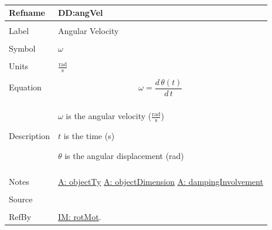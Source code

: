 \documentclass[12pt]{article}
\begin{document}
~\newline
 \noindent \begin{minipage}{\textwidth}
\begin{tabular}{p{} p{}}
\toprule \textbf{Refname} & \textbf{DD:angVel}
\label{DD:angVel}
\\ \midrule \\
Label & Angular Velocity
        \\ \midrule \\
        Symbol & $ω$
                 \\ \midrule \\
                 Units & $\frac{\text{rad}}{\text{s}}$
                         \\ \midrule \\
                         Equation & \begin{displaymath}
                                    ω=\frac{d\,θ\left(t\right)}{d\,t}
                                    \end{displaymath}
                                    \\ \midrule \\
                                    Description & \begin{symbDescription}
                                                  \item{$ω$ is the angular velocity ($\frac{\text{rad}}{\text{s}}$)}
                                                  \item{$t$ is the time (s)}
                                                  \item{$θ$ is the angular displacement (rad)}
                                                  \end{symbDescription}
                                                  \\ \midrule \\
                                                  Notes & \hyperref[A:objectTy]{A: objectTy}
                                                          \hyperref[A:objectDimension]{A: objectDimension}
                                                          \hyperref[A:dampingInvolvement]{A: dampingInvolvement}
                                                          \\ \midrule \\
                                                          Source & \\ \midrule \\
                                                                   RefBy & \hyperref[IM:rotMot]{IM: rotMot}.
\\ \bottomrule \end{tabular}
\end{minipage}\\
\end{document}
